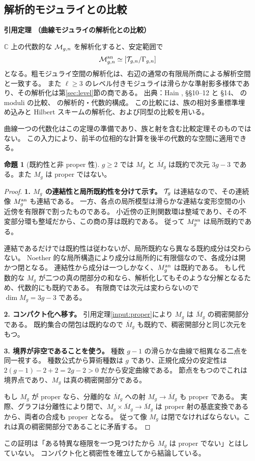 \documentclass[dvipdfmx,a4paper,11pt]{article}
\theoremstyle{definition}
\newtheorem{prop}[thm]{命題}
\newcommand{\C}{\mathbb C}\newcommand{\R}{\mathbb R}\newcommand{\Z}{\mathbb Z}\newcommand{\Q}{\mathbb Q}
\newenvironment{external}[1]{\Needspace{7\baselineskip}\refstepcounter{thm}\begin{tcolorbox}[mybox,colback=blue!2,colframe=blue!40!black]\textbf{引用定理 \thethm（#1）}\par}{\end{tcolorbox}}
\begin{document}
\subsection{解析的モジュライとの比較}
\begin{external}{曲線モジュライの解析化との比較}\label{input:comparison}
$\C$ 上の代数的な $\mathcal M_{g,n}$ を解析化すると、安定範囲で
\[
\mathcal M_{g,n}^{\rm an}\simeq[\mathcal T_{g,n}/\Gamma_{g,n}]
\]
となる。粗モジュライ空間の解析化は、右辺の通常の有限局所商による解析空間と一致する。
また $\ell\ge3$ のレベル付きモジュライは滑らかな準射影多様体であり、その解析化は第\ref{sec:level}節の商である。
出典：Hain \cite{Hain}, \S\S10--12 と \S14、\cite{DM} の moduli の比較、\cite{HM} の解析的・代数的構成。
この比較には、族の相対多重標準埋め込みと Hilbert スキームの解析化、および同型の比較を用いる。
\end{external}
曲線一つの代数化はこの定理の準備であり、族と射を含む比較定理そのものではない。
この入力により、前半の位相的な計算を後半の代数的な空間に適用できる。

\begin{prop}[既約性と非 proper 性]\label{prop:irreducible}
$g\ge2$ では $M_g$ と $\overline M_g$ は既約で次元 $3g-3$ である。また $M_g$ は proper ではない。
\end{prop}
\begin{proof}
\textbf{1. $M_g$ の連結性と局所既約性を分けて示す。}
$\mathcal T_g$ は連結なので、その連続像 $M_g^{\rm an}$ も連結である。
一方、各点の局所模型は滑らかな連結な変形空間の小近傍を有限群で割ったものである。
小近傍の正則関数環は整域であり、その不変部分環も整域だから、この商の芽は既約である。
従って $M_g^{\rm an}$ は局所既約である。

連結であるだけでは既約性は従わないが、局所既約なら異なる既約成分は交わらない。
Noether 的な局所構造により成分は局所的に有限個なので、各成分は開かつ閉となる。
連結性から成分は一つしかなく、$M_g^{\rm an}$ は既約である。
もし代数的な $M_g$ が二つの真の閉部分の和なら、解析化してもそのような分解となるため、代数的にも既約である。
有限商では次元は変わらないので $\dim M_g=3g-3$ である。

\textbf{2. コンパクト化へ移す。}
引用定理\ref{input:proper}により $M_g$ は $\overline M_g$ の稠密開部分である。
既約集合の閉包は既約なので $\overline M_g$ も既約で、稠密開部分と同じ次元をもつ。

\textbf{3. 境界が非空であることを使う。}
種数 $g-1$ の滑らかな曲線で相異なる二点を同一視する。
種数公式から算術種数は $g$ であり、正規化成分の安定性は
$2(g-1)-2+2=2g-2>0$ だから安定曲線である。
節点をもつのでこれは境界点であり、$M_g$ は真の稠密開部分である。

もし $M_g$ が proper なら、分離的な $\overline M_g$ への射 $M_g\to\overline M_g$ も proper である。
実際、グラフは分離性により閉で、$M_g\times\overline M_g\to\overline M_g$ は proper 射の基底変換であるから、両者の合成も proper となる。
従って像 $M_g$ は閉でなければならない。これは真の稠密開部分であることに矛盾する。
\end{proof}
この証明は「ある特異な極限を一つ見つけたから $M_g$ は proper でない」とはしていない。
コンパクト化と稠密性を確立してから結論している。
\end{document}
